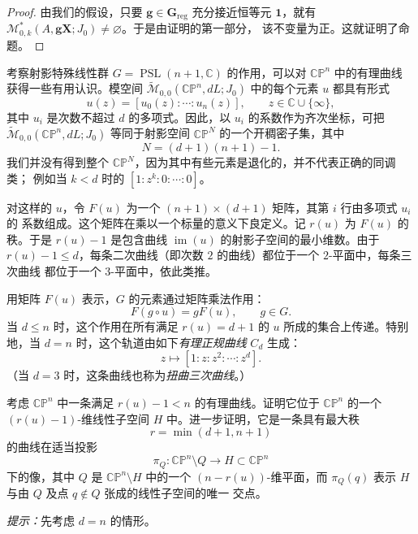 \begin{proof}
由我们的假设，只要 $\mathbf g\in\mathbf G_{\mathrm{reg}}$ 充分接近恒等元 $\mathbf1$，就有
$\mathcal M^*_{0,k}(A,\mathbf g\mathbf X;J_0)\ne\varnothing$。于是由证明的第一部分，
该不变量为正。这就证明了命题。
\end{proof}

\begin{remark}\label{rem:7-4-6}
考察射影特殊线性群
$G=\operatorname{PSL}(n+1,\mathbb C)$ 的作用，可以对 $\mathbb{CP}^n$ 中的有理曲线
获得一些有用认识。模空间
$\widetilde{\mathcal M}_{0,0}(\mathbb{CP}^n,dL;J_0)$ 中的每个元素 $u$ 都具有形式
\[
  u(z)=[u_0(z):\cdots:u_n(z)],
  \qquad z\in\mathbb C\cup\{\infty\},
\]
其中 $u_i$ 是次数不超过 $d$ 的多项式。因此，以 $u_i$ 的系数作为齐次坐标，可把
$\widetilde{\mathcal M}_{0,0}(\mathbb{CP}^n,dL;J_0)$ 等同于射影空间
$\mathbb{CP}^N$ 的一个开稠密子集，其中
\[
  N=(d+1)(n+1)-1.
\]
我们并没有得到整个 $\mathbb{CP}^N$，因为其中有些元素是退化的，并不代表正确的同调类；
例如当 $k<d$ 时的 $[1:z^k:0:\cdots:0]$。

对这样的 $u$，令 $F(u)$ 为一个 $(n+1)\times(d+1)$ 矩阵，其第 $i$ 行由多项式 $u_i$ 的
系数组成。这个矩阵在乘以一个标量的意义下良定义。记 $r(u)$ 为 $F(u)$ 的秩。于是
$r(u)-1$ 是包含曲线 $\operatorname{im}(u)$ 的射影子空间的最小维数。由于
$r(u)-1\le d$，每条二次曲线（即次数 $2$ 的曲线）都位于一个 $2$-平面中，每条三次曲线
都位于一个 $3$-平面中，依此类推。

用矩阵 $F(u)$ 表示，$G$ 的元素通过矩阵乘法作用：
\[
  F(g\circ u)=gF(u),
  \qquad g\in G.
\]
当 $d\le n$ 时，这个作用在所有满足 $r(u)=d+1$ 的 $u$ 所成的集合上传递。特别地，当
$d=n$ 时，这个轨道由如下\emph{有理正规曲线} $C_d$ 生成：
\[
  z\longmapsto[1:z:z^2:\cdots:z^d].
\]
（当 $d=3$ 时，这条曲线也称为\emph{扭曲三次曲线}。）
\end{remark}

\begin{exercise}\label{ex:7-4-7}
考虑 $\mathbb{CP}^n$ 中一条满足 $r(u)-1<n$ 的有理曲线。证明它位于
$\mathbb{CP}^n$ 的一个 $(r(u)-1)$-维线性子空间 $H$ 中。进一步证明，它是一条具有最大秩
\[
  r=\min(d+1,n+1)
\]
的曲线在适当投影
\[
  \pi_Q:\mathbb{CP}^n\setminus Q\longrightarrow H\subset\mathbb{CP}^n
\]
下的像，其中 $Q$ 是 $\mathbb{CP}^n\setminus H$ 中的一个 $(n-r(u))$-维平面，而
$\pi_Q(q)$ 表示 $H$ 与由 $Q$ 及点 $q\notin Q$ 张成的线性子空间的唯一
交点。

\emph{提示：}先考虑 $d=n$ 的情形。
\end{exercise}


